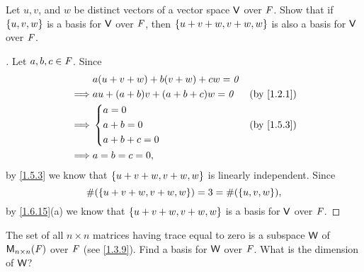 \begin{ex}\label{ex:1.6.12}
  Let \(u, v\), and \(w\) be distinct vectors of a vector space \(\mathsf{V}\) over \(\mathit{F}\).
  Show that if \(\left\lbrace u, v, w\right\rbrace\) is a basis for \(\mathsf{V}\) over \(\mathit{F}\), then \(\left\lbrace u + v + w, v + w, w\right\rbrace\) is also a basis for \(\mathsf{V}\) over \(\mathit{F}\).
\end{ex}

\begin{proof}[]
  Let \(a, b, c \in \mathit{F}\).
  Since
  \begin{align*}
             & a(u + v + w) + b(v + w) + cw = \zv                               \\
    \implies & au + (a + b)v + (a + b + c)w = \zv &  & \text{(by \cref{1.2.1})} \\
    \implies & \begin{dcases}
      a = 0     \\
      a + b = 0 \\
      a + b + c = 0
    \end{dcases}         &  & \text{(by \cref{1.5.3})} \\
    \implies & a = b = c = 0,
  \end{align*}
  by \cref{1.5.3} we know that \(\left\lbrace u + v + w, v + w, w\right\rbrace\) is linearly independent.
  Since
  \[
    \#(\left\lbrace u + v + w, v + w, w\right\rbrace) = 3 = \#(\left\lbrace u, v, w\right\rbrace),
  \]
  by \cref{1.6.15}(a) we know that \(\left\lbrace u + v + w, v + w, w\right\rbrace\) is a basis for \(\mathsf{V}\) over \(\mathit{F}\).
\end{proof}

\setcounter{ex}{14}
\begin{ex}\label{ex:1.6.15}
  The set of all \(n \times n\) matrices having trace equal to zero is a subspace \(\mathsf{W}\) of \(\mathsf{M}_{{n} \times n}({\mathit{F}})\) over \(\mathit{F}\) (see \cref{1.3.9}).
  Find a basis for \(\mathsf{W}\) over \(\mathit{F}\).
  What is the dimension of \(\mathsf{W}\)?
\end{ex}

